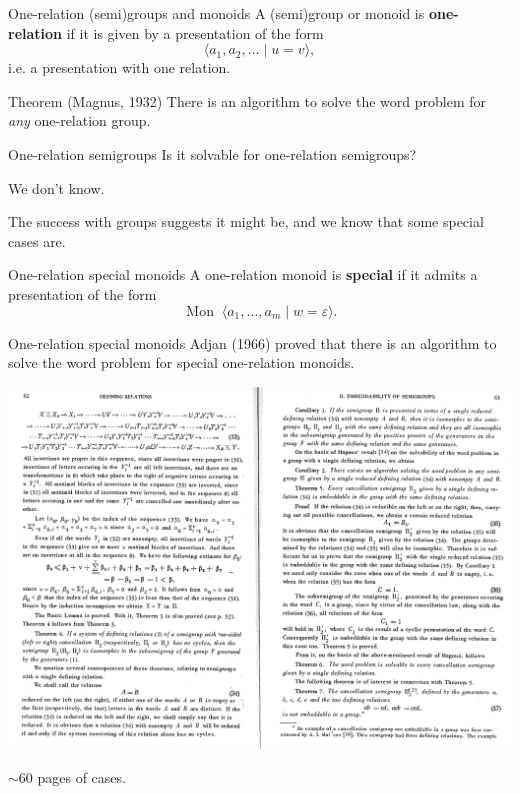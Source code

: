 \documentclass{beamer}
\let\epsilon\varepsilon
\newcommand{\Mon}{\operatorname{Mon}\;}
\newcommand{\pskip}{\medskip}
\begin{document}
\begin{frame}{One-relation (semi)groups and monoids}
	A (semi)group or monoid is \textbf{one-relation} if it is given by a presentation of the form
		\[ \langle a_1, a_2, \ldots \mid u = v \rangle, \]
	i.e. a presentation with one relation.\pskip

	\pause
	\begin{block}{Theorem (Magnus, 1932)}
		There is an algorithm to solve the word problem for \emph{any} one-relation group.
	\end{block}
\end{frame}

\begin{frame}{One-relation semigroups}
	Is it solvable for one-relation semigroups?\pskip

	\pause
	We don't know.\pskip

	\pause
	The success with groups suggests it might be, and we know that some special cases are.
\end{frame}

\begin{frame}{One-relation special monoids}
	A one-relation monoid is \textbf{special} if it admits a presentation of the form
		\[ \Mon \langle a_1, \ldots, a_m \mid w = \epsilon \rangle. \]
\end{frame}

\begin{frame}{One-relation special monoids}
	Adjan (1966) proved that there is an algorithm to solve the word problem for special one-relation monoids.

	\begin{center}
		\vspace{-0.2cm}
		\includegraphics[height=0.65\textheight]{adjan.png}
	\end{center}

	\pause
	\vspace{-0.5cm}
	$\sim$60 pages of cases.
\end{frame}
\end{document}
